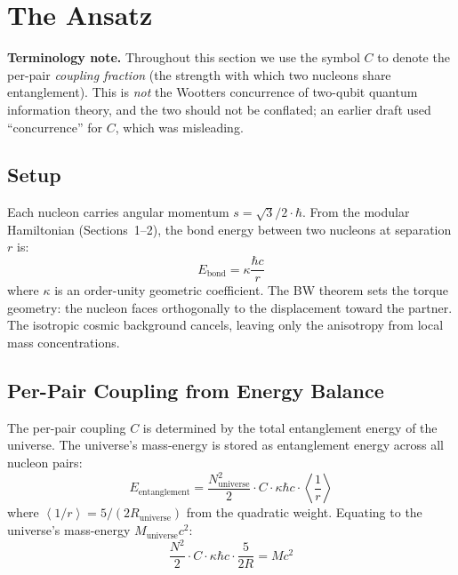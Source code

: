 \documentclass[11pt,letterpaper]{article}
\newcommand{\Runiv}{R_{\mathrm{universe}}}
\newcommand{\Muniv}{M_{\mathrm{universe}}}
\newcommand{\Nuniv}{N_{\mathrm{universe}}}
\newcommand{\av}[1]{\left\langle #1 \right\rangle}
\begin{document}
\section{The Ansatz}

\textbf{Terminology note.} Throughout this section we use the symbol $C$ to
denote the per-pair \emph{coupling fraction} (the strength with which two
nucleons share entanglement). This is \emph{not} the Wootters concurrence of
two-qubit quantum information theory, and the two should not be conflated; an
earlier draft used ``concurrence'' for $C$, which was misleading.

\subsection{Setup}

Each nucleon carries angular momentum $s = \sqrt{3}/2 \cdot \hbar$. From
the modular Hamiltonian (Sections~1--2), the bond energy between two
nucleons at separation $r$ is:
\begin{equation}
  E_{\mathrm{bond}} = \kappa \frac{\hbar c}{r}
  \label{eq:bond_energy}
\end{equation}
where $\kappa$ is an order-unity geometric coefficient. The BW theorem
sets the torque geometry: the nucleon faces orthogonally to the
displacement toward the partner. The isotropic cosmic background
cancels, leaving only the anisotropy from local mass concentrations.

\subsection{Per-Pair Coupling from Energy Balance}

The per-pair coupling $C$ is determined by the total entanglement
energy of the universe. The universe's mass-energy is stored as
entanglement energy across all nucleon pairs:
\begin{equation}
  E_{\mathrm{entanglement}}
  = \frac{\Nuniv^2}{2} \cdot C \cdot \kappa \hbar c \cdot \av{\frac{1}{r}}
  \label{eq:total_entangle}
\end{equation}
where $\av{1/r} = 5/(2\Runiv)$ from the quadratic weight.
Equating to the universe's mass-energy $\Muniv c^2$:
\begin{equation}
  \frac{N^2}{2} \cdot C \cdot \kappa \hbar c \cdot \frac{5}{2R} = M c^2
  \label{eq:energy_balance}
\end{equation}
\end{document}
